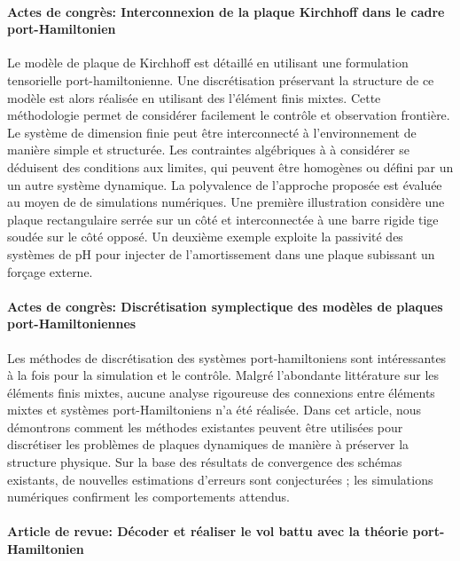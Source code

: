\documentclass[french]{article}
\begin{document}
\paragraph{Actes de congrès: Interconnexion de la plaque Kirchhoff dans le cadre port-Hamiltonien \cite{brugnoli2019cdc} \\}

Le modèle de plaque de Kirchhoff est détaillé en utilisant une formulation tensorielle port-hamiltonienne. Une discrétisation préservant la structure de ce modèle est alors réalisée en utilisant des l'élément finis mixtes. Cette méthodologie permet de considérer facilement le contrôle et observation frontière. Le système de dimension finie peut être interconnecté à l'environnement de manière simple et structurée. Les contraintes algébriques à à considérer se déduisent des conditions aux limites, qui peuvent être homogènes ou défini par un un autre système dynamique. La polyvalence de l'approche proposée est évaluée au moyen de
de simulations numériques. Une première illustration considère une plaque rectangulaire serrée sur un côté et interconnectée à une barre rigide tige soudée sur le côté opposé. Un deuxième exemple exploite la passivité des systèmes de pH pour injecter de l'amortissement dans une plaque subissant un forçage externe. 


\paragraph{Actes de congrès: Discrétisation symplectique des modèles de plaques port-Hamiltoniennes~\cite{brugnoli2020mtns} \\}

Les méthodes de discrétisation des systèmes port-hamiltoniens sont intéressantes à la fois pour la simulation et le contrôle. Malgré l'abondante littérature sur les éléments finis mixtes, aucune analyse rigoureuse des connexions entre éléments mixtes et systèmes port-Hamiltoniens n'a été réalisée. Dans cet article, nous démontrons comment les méthodes existantes peuvent être utilisées pour discrétiser les problèmes de plaques dynamiques de manière à préserver la structure physique. Sur la base des résultats de convergence des schémas existants, de nouvelles estimations d'erreurs sont conjecturées ; les simulations numériques confirment les comportements attendus.

\paragraph{Article de revue: Décoder et réaliser le vol battu avec la théorie port-Hamiltonien \cite{califano2021} \\}
\end{document}
